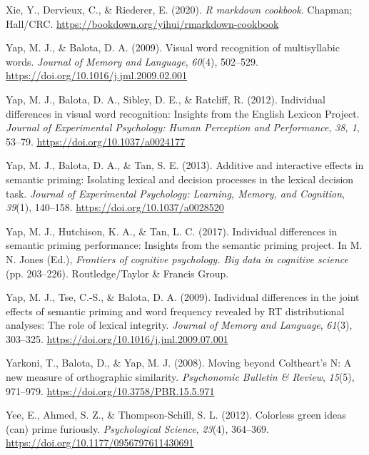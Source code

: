 \documentclass[
  12pt,
  man,floatsintext]{apa7}
\newlength{\cslhangindent}
\newlength{\cslentryspacingunit} %
\newenvironment{CSLReferences}[2] %
 {%
  \setlength{\parindent}{0pt}
  \ifodd #1
  \let\oldpar\par
  \def\par{\hangindent=\cslhangindent\oldpar}
  \fi
  \setlength{\parskip}{#2\cslentryspacingunit}
 }%
 {}
\begin{document}
\begin{CSLReferences}{1}{0}
\leavevmode{}%
Xie, Y., Dervieux, C., \& Riederer, E. (2020). \emph{R markdown cookbook}. Chapman; Hall/CRC. \url{https://bookdown.org/yihui/rmarkdown-cookbook}

\leavevmode{}%
Yap, M. J., \& Balota, D. A. (2009). Visual word recognition of multisyllabic words. \emph{Journal of Memory and Language}, \emph{60}(4), 502--529. \url{https://doi.org/10.1016/j.jml.2009.02.001}

\leavevmode{}%
Yap, M. J., Balota, D. A., Sibley, D. E., \& Ratcliff, R. (2012). Individual differences in visual word recognition: {Insights} from the {English Lexicon Project}. \emph{Journal of Experimental Psychology: Human Perception and Performance}, \emph{38, 1}, 53--79. \url{https://doi.org/10.1037/a0024177}

\leavevmode{}%
Yap, M. J., Balota, D. A., \& Tan, S. E. (2013). Additive and interactive effects in semantic priming: {Isolating} lexical and decision processes in the lexical decision task. \emph{Journal of Experimental Psychology: Learning, Memory, and Cognition}, \emph{39}(1), 140--158. \url{https://doi.org/10.1037/a0028520}

\leavevmode{}%
Yap, M. J., Hutchison, K. A., \& Tan, L. C. (2017). Individual differences in semantic priming performance: {Insights} from the semantic priming project. In M. N. Jones (Ed.), \emph{Frontiers of cognitive psychology. {Big} data in cognitive science} (pp. 203--226). {Routledge/Taylor \& Francis Group}.

\leavevmode{}%
Yap, M. J., Tse, C.-S., \& Balota, D. A. (2009). Individual differences in the joint effects of semantic priming and word frequency revealed by {RT} distributional analyses: {The} role of lexical integrity. \emph{Journal of Memory and Language}, \emph{61}(3), 303--325. \url{https://doi.org/10.1016/j.jml.2009.07.001}

\leavevmode{}%
Yarkoni, T., Balota, D., \& Yap, M. J. (2008). Moving beyond {Coltheart}'s {N}: {A} new measure of orthographic similarity. \emph{Psychonomic Bulletin \& Review}, \emph{15}(5), 971--979. \url{https://doi.org/10.3758/PBR.15.5.971}

\leavevmode{}%
Yee, E., Ahmed, S. Z., \& Thompson-Schill, S. L. (2012). Colorless green ideas (can) prime furiously. \emph{Psychological Science}, \emph{23}(4), 364--369. \url{https://doi.org/10.1177/0956797611430691}


\end{CSLReferences}
\end{document}
